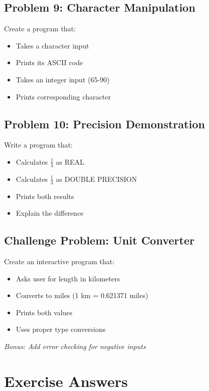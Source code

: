 \documentclass{book}
\begin{document}
\subsection*{Problem 9: Character Manipulation}
Create a program that:
\begin{itemize}
    \item Takes a character input
    \item Prints its ASCII code
    \item Takes an integer input (65-90)
    \item Prints corresponding character
\end{itemize}

\subsection*{Problem 10: Precision Demonstration}
Write a program that:
\begin{itemize}
    \item Calculates \( \frac{1}{3} \) as REAL
    \item Calculates \( \frac{1}{3} \) as DOUBLE PRECISION
    \item Prints both results
    \item Explain the difference
\end{itemize}

\subsection*{Challenge Problem: Unit Converter}
Create an interactive program that:
\begin{itemize}
    \item Asks user for length in kilometers
    \item Converts to miles (1 km = 0.621371 miles)
    \item Prints both values
    \item Uses proper type conversions
\end{itemize}
\textit{Bonus: Add error checking for negative inputs}

\section{Exercise Answers}
\end{document}
